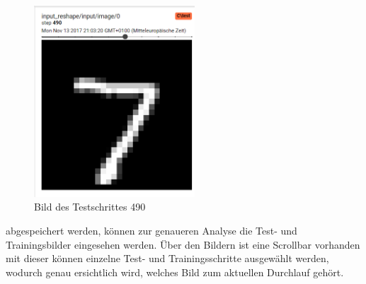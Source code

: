 \vspace{1.4cm}
\begin{figure}
	\vspace{-45pt}
	\includegraphics[width=6cm]{images/Kapitel_3/images.png}
	\caption{Bild des Testschrittes 490}
\end{figure}

abgespeichert werden, können zur genaueren Analyse die Test- und Trainingsbilder eingesehen werden. 
Über den Bildern ist eine Scrollbar vorhanden mit dieser können einzelne Test- und Trainingsschritte ausgewählt werden, wodurch genau ersichtlich wird, welches Bild zum aktuellen Durchlauf gehört.
\vspace{50pt}
\newpage



